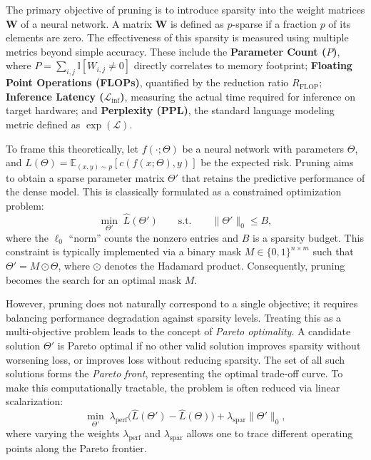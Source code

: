 The primary objective of pruning is to introduce sparsity into the weight matrices $\mathbf{W}$ of a neural network. A matrix $\mathbf{W}$ is defined as $p$-sparse if a fraction $p$ of its elements are zero. The effectiveness of this sparsity is measured using multiple metrics beyond simple accuracy. These include the \textbf{Parameter Count ($P$)}, where $P = \sum_{i,j} \mathbb{I}[W_{i,j} \neq 0]$ directly correlates to memory footprint; \textbf{Floating Point Operations (FLOPs)}, quantified by the reduction ratio $R_{\text{FLOP}}$; \textbf{Inference Latency ($\mathcal{L}_{\text{inf}}$)}, measuring the actual time required for inference on target hardware; and \textbf{Perplexity (PPL)}, the standard language modeling metric defined as $\exp(\mathcal{L})$.

To frame this theoretically, let $f(\cdot;\Theta)$ be a neural network with parameters $\Theta$, and $L(\Theta) = \mathbb{E}_{(x,y)\sim p}[c(f(x;\Theta),y)]$ be the expected risk. Pruning aims to obtain a sparse parameter matrix $\Theta'$ that retains the predictive performance of the dense model. This is classically formulated as a constrained optimization problem:
\begin{equation}
\label{eq:pruning_constrained}
\min_{\Theta'} \;\widehat L(\Theta')
\qquad \text{s.t.}\qquad
\|\Theta'\|_{0} \le B,
\end{equation}
where the $\ell_0$ ``norm'' counts the nonzero entries and $B$ is a sparsity budget. This constraint is typically implemented via a binary mask $M \in \{0,1\}^{n\times m}$ such that $\Theta' = M \odot \Theta$, where $\odot$ denotes the Hadamard product. Consequently, pruning becomes the search for an optimal mask $M$.

However, pruning does not naturally correspond to a single objective; it requires balancing performance degradation against sparsity levels. Treating this as a multi-objective problem leads to the concept of \emph{Pareto optimality}. A candidate solution $\Theta'$ is Pareto optimal if no other valid solution improves sparsity without worsening loss, or improves loss without reducing sparsity. The set of all such solutions forms the \emph{Pareto front}, representing the optimal trade-off curve. To make this computationally tractable, the problem is often reduced via linear scalarization:
\begin{equation}
\label{eq:scalarization}
\min_{\Theta'}\;
\lambda_{\mathrm{perf}}
\big(\widehat L(\Theta') - \widehat L(\Theta)\big)
+
\lambda_{\mathrm{spar}}\|\Theta'\|_0,
\end{equation}
where varying the weights $\lambda_{\mathrm{perf}}$ and $\lambda_{\mathrm{spar}}$ allows one to trace different operating points along the Pareto frontier.

